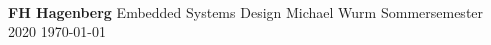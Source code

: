\thispagestyle{empty} %
\mbox{}\\ \\ \\

\begin{center}

	\LARGE \textbf{  }
	\linebreak
	\linebreak
	\linebreak
	\linebreak
	\linebreak
	\horizontalLine{0.5 mm}
	\linebreak
	\linebreak
	\textbf{\huge \UebungNr}
	\linebreak
	\linebreak
	\linebreak
	\textbf{\Large \UebungTopic}
	\linebreak
	\linebreak
	\horizontalLine{0.5 mm}
	\linebreak
	\linebreak
	\linebreak
	\linebreak
	\linebreak
	\linebreak
	\Large {\textbf{FH Hagenberg}}
	\linebreak
	\linebreak
	\Large { Embedded Systems Design }
	\linebreak
	\linebreak
	\Large {  }
	\linebreak
	\linebreak
	\linebreak
	\linebreak
	\linebreak
	\Large {Michael Wurm}
	\linebreak
	\linebreak
	\linebreak
	\linebreak
	\linebreak
	\normalsize{ Sommersemester 2020 }
	\linebreak
	\linebreak
	\large{\today}

\end{center}

